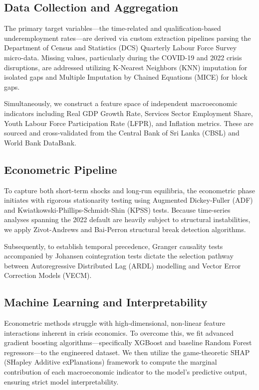 \documentclass[sigconf]{acmart}
\begin{document}
\subsection{Data Collection and Aggregation}
The primary target variables—the time-related and qualification-based underemployment rates—are derived via custom extraction pipelines parsing the Department of Census and Statistics (DCS) Quarterly Labour Force Survey micro-data. Missing values, particularly during the COVID-19 and 2022 crisis disruptions, are addressed utilizing K-Nearest Neighbors (KNN) imputation for isolated gaps and Multiple Imputation by Chained Equations (MICE) for block gaps. 

Simultaneously, we construct a feature space of independent macroeconomic indicators including Real GDP Growth Rate, Services Sector Employment Share, Youth Labour Force Participation Rate (LFPR), and Inflation metrics. These are sourced and cross-validated from the Central Bank of Sri Lanka (CBSL) and World Bank DataBank.

\subsection{Econometric Pipeline}
To capture both short-term shocks and long-run equilibria, the econometric phase initiates with rigorous stationarity testing using Augmented Dickey-Fuller (ADF) and Kwiatkowski-Phillips-Schmidt-Shin (KPSS) tests. Because time-series analyses spanning the 2022 default are heavily subject to structural instabilities, we apply Zivot-Andrews and Bai-Perron structural break detection algorithms. 

Subsequently, to establish temporal precedence, Granger causality tests accompanied by Johansen cointegration tests dictate the selection pathway between Autoregressive Distributed Lag (ARDL) modelling and Vector Error Correction Models (VECM).

\subsection{Machine Learning and Interpretability}
Econometric methods struggle with high-dimensional, non-linear feature interactions inherent in crisis economics. To overcome this, we fit advanced gradient boosting algorithms—specifically XGBoost \cite{chen2016xgboost} and baseline Random Forest regressors—to the engineered dataset. We then utilize the game-theoretic SHAP (SHapley Additive exPlanations) framework \cite{lundberg2017unified} to compute the marginal contribution of each macroeconomic indicator to the model's predictive output, ensuring strict model interpretability.
\end{document}
